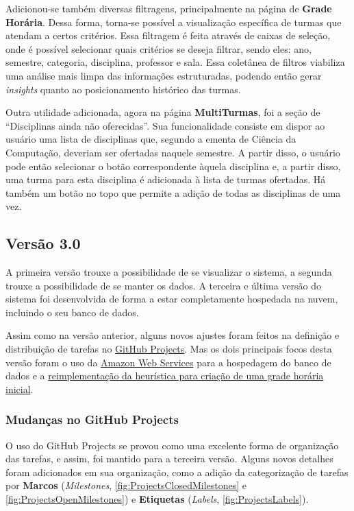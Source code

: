 Adicionou-se também diversas filtragens, principalmente na página de \textbf{Grade Horária}. Dessa forma, torna-se possível a visualização específica de turmas que atendam a certos critérios. Essa filtragem é feita através de caixas de seleção, onde é possível selecionar quais critérios se deseja filtrar, sendo eles: ano, semestre, categoria, disciplina, professor e sala. Essa coletânea de filtros viabiliza uma análise mais limpa das informações estruturadas, podendo então gerar \textit{insights} quanto ao posicionamento histórico das turmas.

Outra utilidade adicionada, agora na página \textbf{MultiTurmas}, foi a seção de ``Disciplinas ainda não oferecidas''. Sua funcionalidade consiste em dispor ao usuário uma lista de disciplinas que, segundo a ementa de Ciência da Computação, deveriam ser ofertadas naquele semestre. A partir disso, o usuário pode então selecionar o botão correspondente àquela disciplina e, a partir disso, uma turma para esta disciplina é adicionada à lista de turmas ofertadas. Há também um botão no topo que permite a adição de todas as disciplinas de uma vez.

\subsection{Versão 3.0} \label{ssec:MVP3} %

A primeira versão trouxe a possibilidade de se visualizar o sistema, a segunda trouxe a possibilidade de se manter os dados. A terceira e última versão do sistema foi desenvolvida de forma a estar completamente hospedada na nuvem, incluindo o seu banco de dados.

Assim como na versão anterior, alguns novos ajustes foram feitos na definição e distribuição de tarefas no \hyperref[sssec:GitHub Projects]{GitHub Projects}. Mas os dois principais focos desta versão foram o uso da \hyperref[sssec:Amazon Web Services]{Amazon Web Services} para a hospedagem do banco de dados e a \hyperref[sssec:Solução inicial]{reimplementação da heurística para criação de uma grade horária inicial}.

\subsubsection*{Mudanças no GitHub Projects} \label{sssec:Mudanças no GitHub Projects}

O uso do GitHub Projects se provou como uma excelente forma de organização das tarefas, e assim, foi mantido para a terceira versão. Alguns novos detalhes foram adicionados em sua organização, como a adição da categorização de tarefas por \textbf{Marcos} (\textit{Milestones}, \autoref{fig:ProjectsClosedMilestones} e \autoref{fig:ProjectsOpenMilestones}) e \textbf{Etiquetas} (\textit{Labels}, \autoref{fig:ProjectsLabels}).

